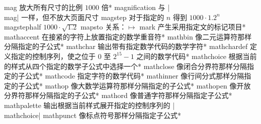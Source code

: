\capcs mag {放大所有尺寸的比例 $1000$ 倍}*{}
\capcs magnification {与 |\\mag| 一样，但不放大页面尺寸}{}{}
\capcs magstep {对于指定的 $n$ 得到 $1000 \cdot 1.2^n$}{}{}
\capcs magstephalf {$1000\cdot\sqrt{1.2}$}{}{}
\capcs mapsto {关系：$\mapsto$}{}{}
\capcs mark {产生采用指定文的标记项目}*{}
\capcs mathaccent {在接紧的字符上放置指定的数学重音符}*{}
\capcs mathbin {像二元运算符那样分隔指定的子公式}*{}
\capcs mathchar {输出带有指定数学代码的数学字符}*{}
\capcs mathchardef {定义指定的控制序列，使之位于 0 至 $2^{15}-1$ 之间的数学代码}*{}
\capcs mathchoice {根据当前的样式从四个指定的数学子公式中选择一个}*{}
\capcs mathclose {像闭合分界符那样分隔指定的子公式}*{}
\capcs mathcode {指定字符的数学代码}*{}
\capcs mathinner {像行间分式那样分隔指定的子公式}*{}
\capcs mathop {像大数学运算符那样分隔指定的子公式}*{}
\capcs mathopen {像开放分界符那样分隔指定的子公式}*{}
\capcs mathord {像普通字符那样分隔指定子公式}*{}
\capcs mathpalette {输出根据当前样式展开指定的控制序列的 |\\mathchoice|}{}{}
\capcs mathpunct {像标点符号那样分隔指定子公式}*{}
